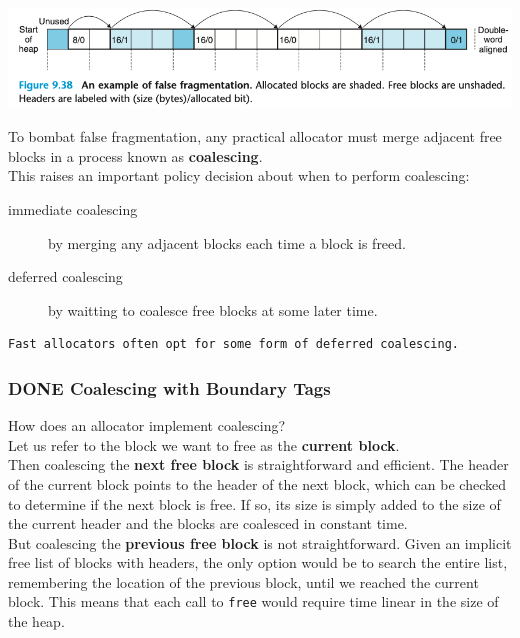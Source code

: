 \documentclass[11pt]{article}
\begin{document}
\begin{center}
\includegraphics[width=.9\linewidth]{pics/figure9.38-false-fragmentation.png}
\end{center}


To bombat false fragmentation, any practical allocator must merge adjacent free blocks in a process known as \textbf{coalescing}.\\

This raises an important policy decision about when to perform coalescing:\\
\begin{description}
\item[{immediate coalescing}] by merging any adjacent blocks each time a block is freed.\\
\item[{deferred coalescing}] by waitting to coalesce free blocks at some later time.\\
\end{description}


\begin{verbatim}
Fast allocators often opt for some form of deferred coalescing.
\end{verbatim}


\subsubsection{{\bfseries\sffamily DONE} Coalescing with Boundary Tags}
\label{sec:orgab6b918}
How does an allocator implement coalescing?\\

Let us refer to the block we want to free as the \textbf{current block}.\\
Then coalescing the \textbf{next free block} is straightforward and efficient. The header of the current block points to the header of the next block, which can be checked to determine if the next block is free. If so, its size is simply added to the size of the current header and the blocks are coalesced in constant time.\\
But coalescing the \textbf{previous free block} is not straightforward. Given an implicit free list of blocks with headers, the only option would be to search the entire list, remembering the location of the previous block, until we reached the current block. This means that each call to \texttt{free} would require time linear in the size of the heap.\\
\end{document}
